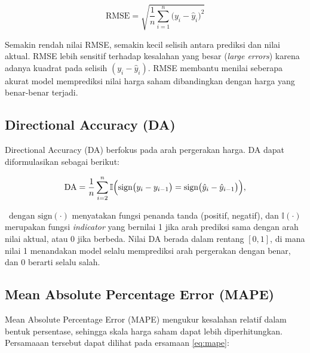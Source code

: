 \begin{equationfloat}
\begin{equation}
\text{RMSE} = 
\sqrt{
  \frac{1}{n}
  \sum_{i=1}^{n} \bigl(y_i - \hat{y}_i\bigr)^2
}
\end{equation}
\caption{\textit{Root Mean Squared Error}}
\label{eq:rmse}
\end{equationfloat}

Semakin rendah nilai RMSE, semakin kecil selisih antara prediksi dan nilai aktual. RMSE lebih sensitif terhadap kesalahan yang besar (\textit{large errors}) karena adanya kuadrat pada selisih \((y_i - \hat{y}_i)\). RMSE membantu menilai seberapa akurat model memprediksi nilai harga saham dibandingkan dengan harga yang benar-benar terjadi.

\subsection{Directional Accuracy (DA)}
\label{subsec:directional-accuracy}

\noindent
Directional Accuracy (DA) berfokus pada arah pergerakan harga. DA dapat diformulasikan sebagai berikut:

\begin{equationfloat}
\begin{equation}
\text{DA} =
\frac{1}{n} \sum_{i=2}^{n}
\mathbb{I}\Bigl(
  \text{sign}\bigl(y_i - y_{i-1}\bigr) = 
  \text{sign}\bigl(\hat{y}_i - \hat{y}_{i-1}\bigr)
\Bigr),
\end{equation}
\caption{\textit{Directional Accuracy}}
\label{eq:da}
\end{equationfloat}

\
dengan \(\text{sign}(\cdot)\) menyatakan fungsi penanda tanda (positif, negatif), dan \(\mathbb{I}(\cdot)\) merupakan fungsi \textit{indicator} yang bernilai 1 jika arah prediksi sama dengan arah nilai aktual, atau 0 jika berbeda. Nilai DA berada dalam rentang \([0,1]\), di mana nilai 1 menandakan model selalu memprediksi arah pergerakan dengan benar, dan 0 berarti selalu salah. 

\subsection{Mean Absolute Percentage Error (MAPE)}
\label{subsec:mape}

\noindent
Mean Absolute Percentage Error (MAPE) mengukur kesalahan relatif dalam bentuk persentase, sehingga skala harga saham dapat lebih diperhitungkan. Persamaaan tersebut dapat dilihat pada ersamaan \ref{eq:mape}:

